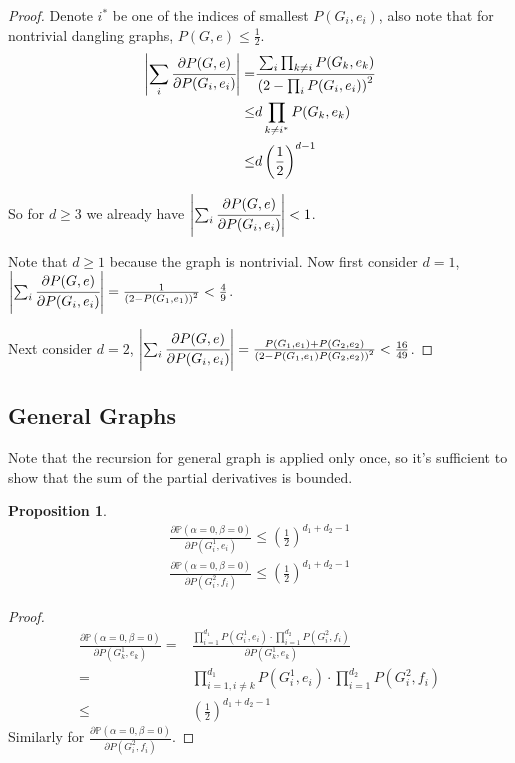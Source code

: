 \documentclass[a4paper]{article}
\newtheorem{Prop}[Thm]{Proposition}
\newcommand{\abs}[1]{\left\vert#1\right\vert}
\begin{document}
	\begin{proof}
		Denote $i^*$ be one of the indices of smallest $P(G_i, e_i)$, also note that for nontrivial dangling graphs, $P(G,e) \leq \frac{1}{2}$.
	\begin{align*}
		\abs{\sum_i \cfrac{\partial P(G,e)}{\partial P(G_i,e_i)}}  =& \cfrac{\sum_i \prod_{k \neq i} P(G_k, e_k)  }{\left( 2 - \prod_i P(G_i, e_i) \right)^2} \\
		\leq & d \prod_{k \neq i^*} P(G_k, e_k) \\
		\leq & d \left( \frac{1}{2} \right)^{d-1}
	\end{align*}

	So for $d \geq 3$ we already have $\abs{\sum_i \cfrac{\partial P(G,e)}{\partial P(G_i,e_i)}} < 1$.

	Note that $d\geq 1$ because the graph is nontrivial.
	Now first consider $d=1$, $\abs{\sum_i \cfrac{\partial P(G,e)}{\partial P(G_i,e_i)}} = \frac{1}{\left( 2 - P(G_1,e_1) \right)^2} < \frac{4}{9} $.

	Next consider $d=2$,  $\abs{\sum_i \cfrac{\partial P(G,e)}{\partial P(G_i,e_i)}} = \frac{P(G_1,e_1) + P(G_2,e_2)}{\left( 2 - P(G_1,e_1)P(G_2,e_2) \right)^2} < \frac{16}{49} $.
	\end{proof}

	\subsection{General Graphs}

	Note that the recursion for general graph is applied only once, so it's sufficient to show that the sum of the partial derivatives is bounded.

	\begin{Prop}
		\begin{align*}
			\frac{\partial \mathbb{P}\left( \alpha = 0, \beta = 0 \right) }{ \partial P(G_i^1, e_i) } \leq (\frac{1}{2})^{d_1 + d_2 -1} \\
			\frac{\partial \mathbb{P}\left( \alpha = 0, \beta = 0 \right) }{ \partial P(G_i^2, f_i) } \leq (\frac{1}{2})^{d_1 + d_2 -1} 
		\end{align*}
	\end{Prop}
	\begin{proof}
		\begin{align*}
			\frac{\partial \mathbb{P}\left( \alpha = 0, \beta = 0 \right) }{ \partial P(G_k^1, e_k) } = &\frac{\prod_{i=1}^{d_1} P(G_i^1, e_i) \cdot \prod_{i=1}^{d_2} P(G_i^2, f_i) }{\partial P(G_k^1, e_k)} \\
			=&\prod_{i=1,i\neq k}^{d_1} P(G_i^1, e_i) \cdot \prod_{i=1}^{d_2} P(G_i^2, f_i)\\
			\leq & (\frac{1}{2})^{d_1 + d_2 -1}
		\end{align*}
		Similarly for $\frac{\partial \mathbb{P}\left( \alpha = 0, \beta = 0 \right) }{ \partial P(G_i^2, f_i) }$.
	\end{proof}
\end{document}
